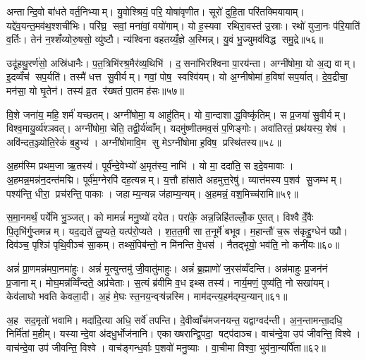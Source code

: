 अन्तान्दि॒वो बा॑धते वर्त॒निभ्याम्। यु॒वोश्श्रियं॒ परि॒ योषा॑वृणीत। सूरो॑ दुहि॒ता परि॑तक्मियायाम्। यद्दे॑व॒यन्त॒मव॑थ॒श्शची॑भिः। परि॑घ्र॒ सवां॒ मना॑वां॒ वयो॑गाम्। यो ह॒स्यवा रथिरा॒वस्त॑ उ॒स्राः। रथो॑ युजा॒नः प॑रि॒याति॑ व॒र्तिः। तेन॑ न॒श्शँय्योरु॒षसो॒ व्यु॑ष्टौ। न्य॑श्विना वहतय्यँ॒ज्ञे अ॒स्मिन्न्। यु॒वं भु॒ज्युमव॑विद्ध समु॒द्रे॥५६॥

उदू॑हथु॒रर्ण॑सो॒ अस्रि॑धानैः। प॒त॒त्रिभि॑रश्र॒मैर॑व्य॒थिभि॑। द॒सना॑भिरश्विना पा॒रय॑न्ता। अग्नी॑षोमा॒ यो अ॒द्य वाम्। इ॒दव्वँच॑ सप॒र्यति॑। तस्मै॑ धत्त सु॒वीर्यम्। गवां॒ पोष॒ स्वश्वि॑यम्। यो अ॒ग्नीषोमा॑ ह॒विषा॑ सप॒र्यात्। दे॒व॒द्रीचा॒ मन॑सा॒ यो घृ॒तेन॑। तस्य॑ व्र॒त र॑ख्षतं पा॒तमह॑सः॥५७॥

वि॒शे जना॑य॒ महि॒ शर्म॑ यच्छतम्। अग्नी॑षोमा॒ य आहु॑तिम्। यो वा॒न्दाशाद्ध॒विष्कृ॑तिम्। स प्र॒जया॑ सु॒वीर्यम्। विश्व॒मायु॒र्व्य॑श्ञवत्। अग्नी॑षोमा॒ चेति॒ तद्वी॒र्य॑व्वाँम्। यदमु॑ष्णीतमव॒सं प॒णिङ्गोः। अवा॑तिरतं॒ प्रथ॑यस्य॒ शेष॑। अवि॑न्दत॒ञ्ज्योति॒रेकं॑ ब॒हुभ्य॑। अग्नी॑षोमावि॒म सु मेऽग्नी॑षोमा ह॒विष॒ प्रस्थि॑तस्य॥५८॥\anuvakamend[ज॒भा॒र॒ द्यौर॒ग्नेरु॒पस्थ॑ उप॒क्ष्यन्तो॑ बद्बधा॒नो व॒ध्वा॑ याद॑मानः समु॒द्रेऽह॑स॒ प्रस्थि॑तस्य]

अ॒हम॑स्मि प्रथम॒जा ऋ॒तस्य॑। पूर्व॑न्दे॒वेभ्यो॑ अ॒मृत॑स्य॒ नाभि॑। यो मा॒ ददा॑ति॒ स इदे॒वमावाः। अ॒हमन्न॒मन्न॑न॒दन्त॑मद्मि। पूर्व॑म॒ग्नेरपि॑ दह॒त्यन्नम्। य॒त्तौ हा॑साते अहमुत्त॒रेषु॑। व्यात्त॑मस्य प॒शव॑ सु॒जम्भम्। पश्य॑न्ति॒ धीरा॒ प्रच॑रन्ति॒ पाकाः। जहाम्य॒न्यन्न ज॑हाम्य॒न्यम्। अ॒हमन्नं॒ वश॒मिच्च॑रामि॥५९॥

स॒मा॒नमर्थं॒ पर्ये॑मि भु॒ञ्जत्। को मामन्नं॑ मनु॒ष्यो॑ दयेत। परा॑के॒ अन्न॒न्निहि॑तल्लोँ॒क ए॒तत्। विश्वैर्दे॒वैः पि॒तृभि॑र्गु॒प्तमन्नम्। यद॒द्यते॑ लु॒प्यते॒ यत्प॑रो॒प्यते। श॒त॒त॒मी सा त॒नूर्मे॑ बभूव। म॒हान्तौ॑ च॒रू स॑कृद्दु॒ग्धेन॑ पप्रौ। दिव॑ञ्च॒ पृश्ञि॑ पृथि॒वीञ्च॑ सा॒कम्। तथ्सं॒पिब॑न्तो॒ न मि॑नन्ति वे॒धस॑। नैतद्भूयो॒ भव॑ति॒ नो कनी॑यः॥६०॥

अन्नं॑ प्रा॒णमन्न॑मपा॒नमा॑हुः। अन्नं॑ मृ॒त्युन्तमु॑ जी॒वातु॑माहुः। अन्नं॑ ब्र॒ह्माणो॑ ज॒रस॑व्वँदन्ति। अन्न॑माहुः प्र॒जन॑नं प्र॒जानाम्। मोघ॒मन्न॑व्विँन्दते॒ अप्र॑चेताः। स॒त्यं ब्र॑वीमि व॒ध इथ्स तस्य॑। नार्य॒मणं॒ पुष्य॑ति॒ नो सखा॑यम्। केव॑लाघो भवति केवला॒दी। अ॒हं मे॒घः स्त॒नय॒न्वऱ़्ष॑न्नस्मि। माम॑दन्त्य॒हम॑द्म्य॒न्यान्॥६१॥

अ॒ह सद॒मृतो॑ भवामि। मदा॑दि॒त्या अधि॒ सर्वे॑ तपन्ति। दे॒वीव्वाँच॑मजनयन्त॒ यद्वाग्वद॑न्ती। अ॒न॒न्तामन्ता॒दधि॒ निर्मि॑तां म॒हीम्। यस्यान्दे॒वा अ॑दधु॒र्भोज॑नानि। एकाख्षरान्द्वि॒पदा॒ षट्प॑दाञ्च। वाच॑न्दे॒वा उप॑ जीवन्ति॒ विश्वे। वाच॑न्दे॒वा उप॑ जीवन्ति॒ विश्वे। वाच॑ङ्गन्ध॒र्वाः प॒शवो॑ मनु॒ष्याः। वा॒चीमा विश्वा॒ भुव॑ना॒न्यर्पि॑ता॥६२॥

